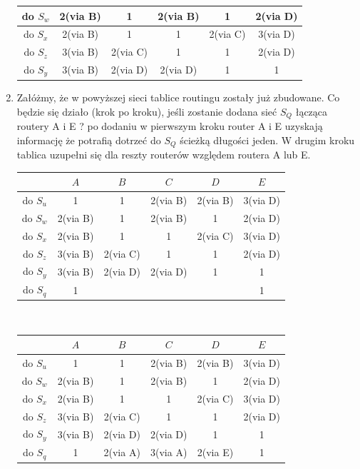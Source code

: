 \documentclass{article}[A4]
\begin{document}
\begin{enumerate}
\begin{center}
\begin{tabular}{c||c|c|c|c|c|}
	 \hline
	 do $S_w$&2(via B)&1&2(via B)&1&2(via D)\\ 
	 \hline
	 do $S_x$&2(via B)&1&1&2(via C)&3(via D)\\ 
	 \hline
	 do $S_z$&3(via B)&2(via C)&1&1&2(via D)\\ 
	 \hline
	 do $S_y$&3(via B) &2(via D)&2(via D)&1&1\\ 
	 \hline \hline
	\end{tabular}
\end{center}
\item{Załóżmy, że w powyższej sieci tablice routingu zostały już zbudowane. Co będzie się działo (krok po kroku), jeśli zostanie dodana sieć $S_Q$ łącząca routery A i E ?}
po dodaniu w pierwszym kroku router A i E uzyskają informację że potrafią dotrzeć do $S_Q$ ścieżką długości jeden. W drugim kroku tablica uzupełni się dla reszty routerów względem routera A lub E.
\begin{center}
\begin{tabular}{c||c|c|c|c|c|} 
	  &$A$&$B$&$C$&$D$&$E$\\
	 \hline \hline
	 do $S_u$&1&1&2(via B)&2(via B)&3(via D)\\ 
	 \hline
	 do $S_w$&2(via B)&1&2(via B)&1&2(via D)\\ 
	 \hline
	 do $S_x$&2(via B)&1&1&2(via C)&3(via D)\\ 
	 \hline
	 do $S_z$&3(via B)&2(via C)&1&1&2(via D)\\ 
	 \hline
	 do $S_y$&3(via B) &2(via D)&2(via D)&1&1\\ 
	 \hline 
	 do $S_q$&1& & & &1\\
	 \hline \hline
	 
\end{tabular}\\
	 \vspace{1em}
\begin{tabular}{c||c|c|c|c|c|} 
	  &$A$&$B$&$C$&$D$&$E$\\
	 \hline \hline
	 do $S_u$&1&1&2(via B)&2(via B)&3(via D)\\ 
	 \hline
	 do $S_w$&2(via B)&1&2(via B)&1&2(via D)\\ 
	 \hline
	 do $S_x$&2(via B)&1&1&2(via C)&3(via D)\\ 
	 \hline
	 do $S_z$&3(via B)&2(via C)&1&1&2(via D)\\ 
	 \hline
	 do $S_y$&3(via B) &2(via D)&2(via D)&1&1\\ 
	 \hline 
	 do $S_q$&1&2(via A)&3(via A)&2(via E)&1\\
	 \hline \hline
\end{tabular}
\end{center}


\end{enumerate}
\end{document}
